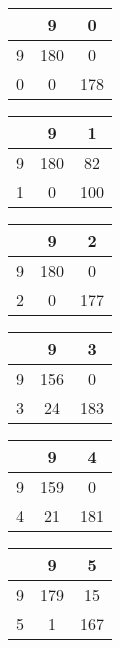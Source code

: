 \documentclass[12pt]{article}
\begin{document}
		\begin{multicols}{3}
			\begin{tabular}{| c | c | c |}
				\hline
				& 9 & 0 \\ 
				\hline
				9 & 180 & 0 \\ 
				\hline
				0 & 0 & 178 \\ 
				\hline
			\end{tabular}
			\newline


			\begin{tabular}{| c | c | c |}
				\hline
				& 9 & 1 \\ 
				\hline
				9 & 180 & 82 \\ 
				\hline
				1 & 0 & 100 \\ 
				\hline
			\end{tabular}
			\newline


			\begin{tabular}{| c | c | c |}
				\hline
				& 9 & 2 \\ 
				\hline
				9 & 180 & 0 \\ 
				\hline
				2 & 0 & 177 \\ 
				\hline
			\end{tabular}
			\newline


			\begin{tabular}{| c | c | c |}
				\hline
				& 9 & 3 \\ 
				\hline
				9 & 156 & 0 \\ 
				\hline
				3 & 24 & 183 \\ 
				\hline
			\end{tabular}
			\newline


			\begin{tabular}{| c | c | c |}
				\hline
				& 9 & 4 \\ 
				\hline
				9 & 159 & 0 \\ 
				\hline
				4 & 21 & 181 \\ 
				\hline
			\end{tabular}
			\newline


			\begin{tabular}{| c | c | c |}
				\hline
				& 9 & 5 \\ 
				\hline
				9 & 179 & 15 \\ 
				\hline
				5 & 1 & 167 \\ 
				\hline
			\end{tabular}
			\newline



\end{multicols}
\end{document}
